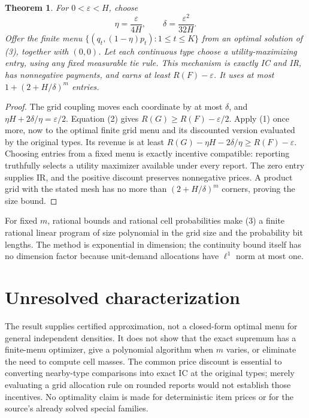 \documentclass[11pt]{article}
\newtheorem{theorem}{Theorem}
\theoremstyle{definition}
\begin{document}
\begin{theorem}
For $0<\varepsilon<H$, choose
\[
 \eta=\frac{\varepsilon}{4H},\qquad
 \delta=\frac{\varepsilon^2}{32H}.
\]
Offer the finite menu $\{(q_t,(1-\eta)p_t):1\le t\le K\}$ from an
optimal solution of (3), together with $(0,0)$. Let each continuous type
choose a utility-maximizing entry, using any fixed measurable tie rule.
This mechanism is exactly IC and IR, has nonnegative payments, and earns
at least $R(F)-\varepsilon$.
It uses at most $1+(2+H/\delta)^m$ entries.
\end{theorem}
\begin{proof}
The grid coupling moves each coordinate by at most $\delta$, and
$\eta H+2\delta/\eta=\varepsilon/2$. Equation (2) gives
$R(G)\ge R(F)-\varepsilon/2$. Apply (1) once more, now to the optimal
finite grid menu and its discounted version evaluated by the original
types. Its revenue is at least
$R(G)-\eta H-2\delta/\eta\ge R(F)-\varepsilon$.
Choosing entries from a fixed menu is exactly incentive compatible:
reporting truthfully selects a utility maximizer available under every
report. The zero entry supplies IR, and the positive discount preserves
nonnegative prices. A product grid with the stated mesh has no more than
$(2+H/\delta)^m$ corners, proving the size bound.
\end{proof}

For fixed $m$, rational bounds and rational cell probabilities make (3)
a finite rational linear program of size polynomial in the grid size
and the probability bit lengths. The method is exponential in dimension;
the continuity bound itself has no dimension factor because unit-demand
allocations have $\ell^1$ norm at most one.

\section*{Unresolved characterization}
The result supplies certified approximation, not a closed-form optimal
menu for general independent densities. It does not show that the exact
supremum has a finite-menu optimizer, give a polynomial algorithm when
$m$ varies, or eliminate the need to compute cell masses. The common
price discount is essential to converting nearby-type comparisons into
exact IC at the original types; merely evaluating a grid allocation rule
on rounded reports would not establish those incentives. No optimality
claim is made for deterministic item prices or for the source's already
solved special families.
\end{document}
